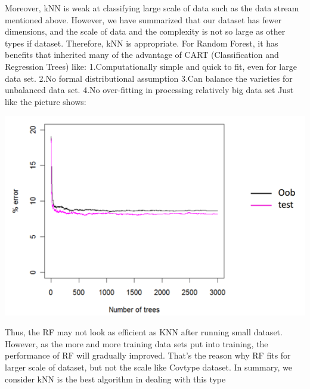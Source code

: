 \documentclass[12pt]{report}
\begin{document}
\newline
\newline
Moreover, kNN is weak at classifying large scale of data such as the data stream mentioned above. However, we have summarized that our dataset has fewer dimensions, and the scale of data and the complexity is not so large as other types if dataset. Therefore, kNN is appropriate.
\newline
\newline
For Random Forest, it has benefits that inherited many of the advantage of CART (Classification and Regression Trees) like: 
\newline 1.Computationally simple and quick to fit, even for large data set.
\newline 2.No formal distributional assumption
\newline 3.Can balance the varieties for unbalanced data set. 
\newline 4.No over-fitting in processing relatively big data set
\newline Just like the picture shows:
\begin{center}
\includegraphics{IMG_2640.png}
\end{center}
Thus, the RF may not look as efficient as KNN after running small dataset. However, as the more and more training data sets put into training, the performance of RF will gradually improved. That's the reason why RF fits for larger scale of dataset, but not the scale like Covtype dataset.
\newline
\newline
In summary, we consider kNN is the best algorithm in dealing with this type
\end{document}
